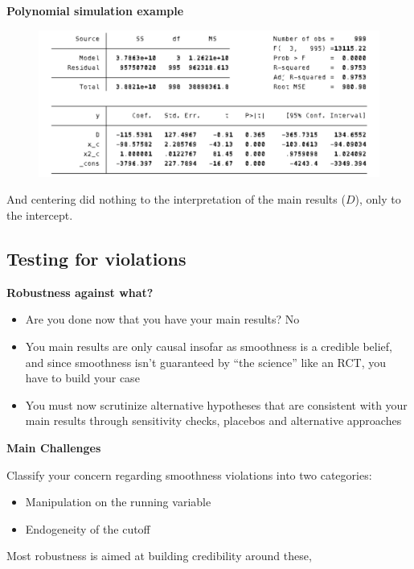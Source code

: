 \documentclass[notes=show]{beamer}
\begin{document}
\begin{frame}[plain]
	\begin{center}
	\textbf{Polynomial simulation example}
	\end{center}

\begin{figure}
\includegraphics[scale=0.2]{./lecture_includes/poly4.png}
\end{figure}

And centering did nothing to the interpretation of the main results ($D$), only to the intercept.

\end{frame}



\subsection{Testing for violations}

\begin{frame}
\begin{center}
\textbf{Robustness against what?}
\end{center}

\begin{itemize}
\item Are you done now that you have your main results? No
\item You main results are only causal insofar as smoothness is a credible belief, and since smoothness isn't guaranteed by ``the science'' like an RCT, you have to build your case
\item You must now scrutinize alternative hypotheses that are consistent with your main results through sensitivity checks, placebos and alternative approaches
\end{itemize}

\end{frame}

\begin{frame}[plain]
\begin{center}
\textbf{Main Challenges}
\end{center}

Classify your concern regarding smoothness violations into two categories:
\begin{itemize}
\item Manipulation on the running variable 
\item Endogeneity of the cutoff
\end{itemize}Most robustness is aimed at building credibility around these, 

\end{frame}
\end{document}
